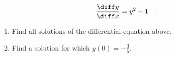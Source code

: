 \begin{equation}\label{eqDFQseparable-yprime=ysquared-1}
\frac{\diff y}{\diff x}= y^2-1\quad .
\end{equation}
\begin{enumerate}
\item \label{problemDFQseparable-yprime=ysquared-1-part1} Find all solutions of the differential equation above.
\item \label{problemDFQseparable-yprime=ysquared-1-part2} Find a solution for which $y(0)=-\frac{3}{5}$.
\end{enumerate}
